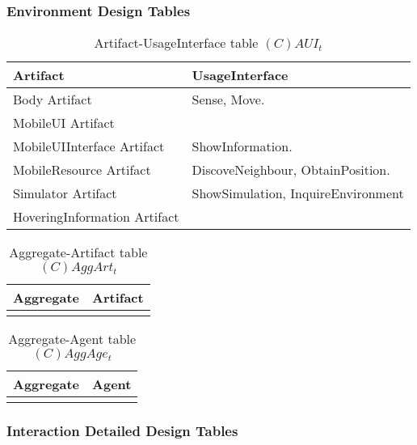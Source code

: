 \subsubsection{Environment Design Tables}

\begin{table}[H]
	\centering
	\begin{tabular}{|p{4cm}|p{8cm}|}
			\hline
			\textbf{Artifact} & \textbf{UsageInterface} \\
			\hline
			Body Artifact & Sense, Move. \\
			\hline
			MobileUI Artifact & \\
			\hline
			MobileUIInterface Artifact & ShowInformation. \\
			\hline
      MobileResource Artifact & DiscoveNeighbour, ObtainPosition. \\
			\hline
      Simulator Artifact & ShowSimulation, InquireEnvironment \\
			\hline
			HoveringInformation Artifact & \\
			\hline
		\end{tabular}
	\caption{Artifact-UsageInterface table $(C)AUI_t$}
	\label{tab:cauit}
\end{table}

\begin{table}[H]
	\centering
	\begin{tabular}{|p{4cm}|p{8cm}|}
			\hline
			\textbf{Aggregate} & \textbf{Artifact} \\
			\hline
			& \\
			\hline
		\end{tabular}
	\caption{Aggregate-Artifact table $(C)AggArt_t$}
	\label{tab:caggartt}
\end{table}

\begin{table}[H]
	\centering
	\begin{tabular}{|p{4cm}|p{8cm}|}
			\hline
			\textbf{Aggregate} & \textbf{Agent} \\
			\hline
			& \\
			\hline
		\end{tabular}
	\caption{Aggregate-Agent table $(C)AggAge_t$}
	\label{tab:caggaget}
\end{table}

\subsubsection{Interaction Detailed Design Tables}

